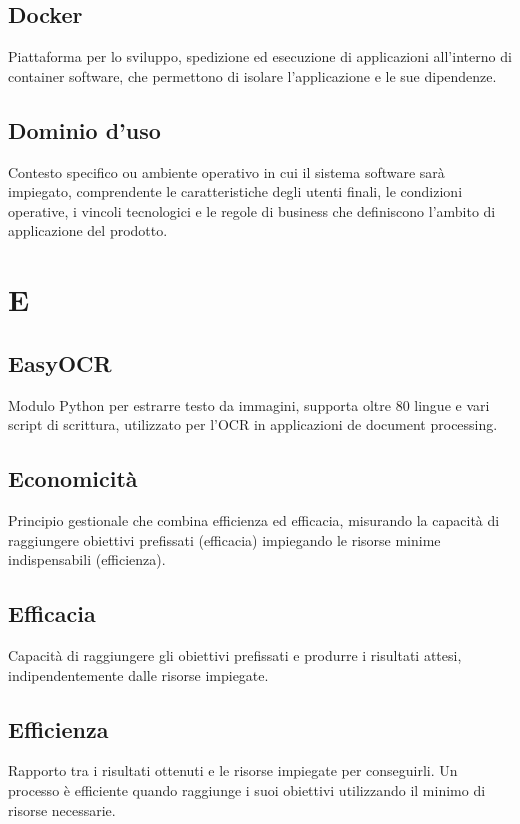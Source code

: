 \documentclass[a4paper,11pt]{article}
\begin{document}
\subsection{Docker}
Piattaforma per lo sviluppo, spedizione ed esecuzione di applicazioni all'interno di container software, che permettono di isolare l'applicazione e le sue dipendenze.

\subsection{Dominio d'uso}
Contesto specifico ou ambiente operativo in cui il sistema software sarà impiegato, comprendente le caratteristiche degli utenti finali, le condizioni operative, i vincoli tecnologici e le regole di business che definiscono l'ambito di applicazione del prodotto.

\newpage
\section{E}

\subsection{EasyOCR}
Modulo Python per estrarre testo da immagini, supporta oltre 80 lingue e vari script di scrittura, utilizzato per l'OCR in applicazioni de document processing.

\subsection{Economicità}
Principio gestionale che combina efficienza ed efficacia, misurando la capacità di raggiungere obiettivi prefissati (efficacia) impiegando le risorse minime indispensabili (efficienza).

\subsection{Efficacia}
Capacità di raggiungere gli obiettivi prefissati e produrre i risultati attesi, indipendentemente dalle risorse impiegate.

\subsection{Efficienza}
Rapporto tra i risultati ottenuti e le risorse impiegate per conseguirli. Un processo è efficiente quando raggiunge i suoi obiettivi utilizzando il minimo di risorse necessarie.
\end{document}
